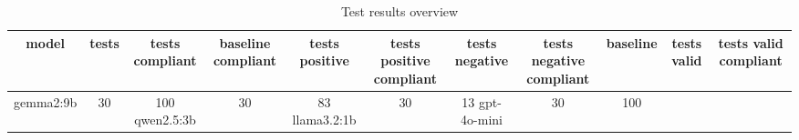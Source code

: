 
  \begin{table}[h!]
  \centering
  \begin{tabular}{|c|c|c|c|c|c|c|c|c|c|c|}
  \hline
  model & tests & tests compliant & baseline compliant & tests positive & tests positive compliant & tests negative & tests negative compliant & baseline & tests valid & tests valid compliant \\
  \hline
  gemma2:9b & 30 & 100%
\hline
qwen2.5:3b & 30 & 83%
\hline
llama3.2:1b & 30 & 13%
\hline
gpt-4o-mini & 30 & 100%
  \end{tabular}
  \caption{Test results overview}
  
  \end{table}
  
